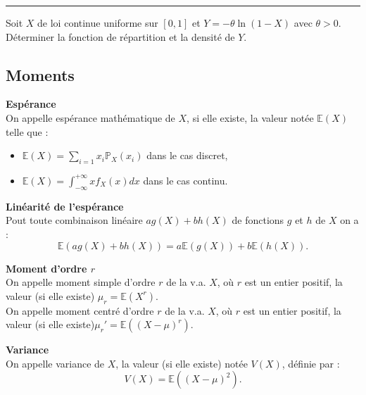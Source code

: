 \documentclass[../PolyS4.tex]{subfiles}
\begin{document}
\vspace{1em}
\hrule
\vspace{1em}




Soit $X$ de loi continue uniforme sur $[0, 1]$ et $Y = -\theta \ln(1 - X)$ avec $\theta > 0$. Déterminer la fonction de répartition et la densité de $Y$.

\newpage 

\subsection{ Moments}

\begin{Def}
{\textbf{Espérance}\\}
On appelle espérance mathématique de $X$, si elle existe,
la valeur notée $\mathbb{E}(X)$ telle que :
\begin{itemize}
\item $\mathbb{E}(X) =\sum_{i=1}
x_i \mathbb{P}_X(x_i)$ dans le cas discret,
\item $\mathbb{E}(X) =\int_{-\infty}^{+\infty}xf_X(x)dx$ dans le cas continu.
\end{itemize}
\end{Def}



\begin{Prop}
{\textbf{Linéarité de l'espérance}\\}
Pout toute combinaison lin\'eaire $ag(X) + bh(X)$ de fonctions $g$ et $h$ de $X$
on a :
$$\mathbb{E}(ag(X) + bh(X)) = a\mathbb{E}(g(X)) + b\mathbb{E}(h(X)) .$$

\end{Prop}

\begin{Def}
{\textbf{Moment d'ordre $r$}\\}
On appelle moment simple d'ordre $r$ de la v.a. $X$, où $r$ est
un entier positif, la valeur (si elle existe) $\mu_r = \mathbb{E}(X^r)$.\\

On appelle moment centré d'ordre $r$ de la v.a. $X$, où $r$ est
un entier positif, la valeur (si elle existe)$\mu_r' = \mathbb{E}((X-\mu)^r)$.\\
\end{Def}



\begin{Def}
{\textbf{Variance}\\}
On appelle variance de $X$, la valeur (si elle existe) notée
$V (X)$, définie par :
$$V (X) = \mathbb{E}((X - \mu)^2).$$
\end{Def}
\end{document}
